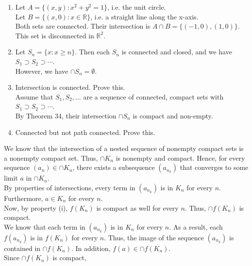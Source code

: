 \documentclass[12pt]{article}
\newenvironment{problem}[2][Problem]{\begin{trivlist}
\item[\hskip \labelsep {\bfseries #1}\hskip \labelsep {\bfseries #2.}]}{\end{trivlist}}
\begin{document}
\begin{problem}{76 on p. 131}
\end{problem}

\begin{enumerate}[label=(\alph*)]
	\item Let $A = \{(x, y): x^2 + y^2 = 1\}$, i.e. the unit circle.\\
	
	Let $B = \{(x, 0): x \in \mathbb{R}\}$, i.e. a straight line along the x-axis.\\
	
	Both sets are connected. Their intersection is $A \cap B = \{(-1, 0), (1, 0)\}$. This set is disconnected in $\mathbb{R}^2$.
	
	\item Let $S_n = \{x: x \geq n\}$. Then each $S_n$ is connected and closed, and we have $S_1 \supset S_2 \supset \cdots$.\\
	
	However, we have $\cap S_n = \emptyset$.
	
	\item Intersection is connected. Prove this.\\
	
	Assume that $S_1, S_2, ...$ are a sequence of connected, compact sets with $S_1 \supset S_2 \supset \cdots$.\\
	
	By Theorem 34, their intersection $\cap S_n$ is compact and non-empty.
	
	\item Connected but not path connected. Prove this.
	
\end{enumerate}

\begin{problem}{1 on p. 147}
\end{problem}

We know that the intersection of a nested sequence of nonempty compact sets is a nonempty compact set. Thus, $\cap K_n$ is nonempty and compact. Hence, for every sequence $(a_n) \in \cap K_n$, there exists a subsequence $(a_{n_k})$ that converges to some limit $a$ in $\cap K_n$.\\

By properties of intersections, every term in $(a_{n_k})$ is in $K_n$ for every $n$. Furthermore, $a \in K_n$ for every $n$.\\

Now, by property (i), $f(K_n)$ is compact as well for every $n$. Thus, $\cap f(K_n)$ is compact.\\

We know that each term in $(a_{n_k})$ is in $K_n$ for every $n$. As a result, each $f(a_{n_k})$ is in $f(K_n)$ for every $n$. Thus, the image of the sequence $(a_{n_k})$ is contained in $\cap f(K_n)$. In addition, $f(a) \in \cap f(K_n)$.\\

Since $\cap f(K_n)$ is compact,
\end{document}

